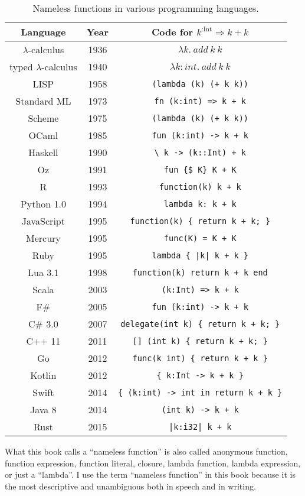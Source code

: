 \begin{table}
\begin{centering}
\begin{tabular}{|c|c|c|}
\hline 
\textbf{Language } & \textbf{Year} & \textbf{Code for }$k^{:\text{Int}}\Rightarrow k+k$\tabularnewline
\hline 
\hline 
$\lambda$-calculus & 1936 & $\lambda k.~add~k~k$\tabularnewline
\hline 
typed $\lambda$-calculus & 1940 & $\lambda k:int.~add~k~k$\tabularnewline
\hline 
LISP & 1958 & \texttt{\footnotesize{}(lambda (k) (+ k k))}\tabularnewline
\hline 
Standard ML & 1973 & \texttt{\footnotesize{}fn (k:int) => k + k}\tabularnewline
\hline 
Scheme & 1975 & \texttt{\footnotesize{}(lambda (k) (+ k k))}\tabularnewline
\hline 
OCaml & 1985 & \texttt{\footnotesize{}fun (k:int) -> k + k}\tabularnewline
\hline 
Haskell  & 1990 & \texttt{\footnotesize{}\textbackslash{} k -> (k::Int) + k}\tabularnewline
\hline 
Oz & 1991 & \texttt{\footnotesize{}fun \{\$ K\} K + K}\tabularnewline
\hline 
R  & 1993 & \texttt{\footnotesize{}function(k) k + k}\tabularnewline
\hline 
Python 1.0 & 1994 & \texttt{\footnotesize{}lambda k: k + k}\tabularnewline
\hline 
JavaScript  & 1995 & \texttt{\footnotesize{}function(k) \{ return k + k; \}}\tabularnewline
\hline 
Mercury  & 1995 & \texttt{\footnotesize{}func(K) = K + K}\tabularnewline
\hline 
Ruby  & 1995 & \texttt{\footnotesize{}lambda \{ |k| k + k \}}\tabularnewline
\hline 
Lua 3.1 & 1998 & \texttt{\footnotesize{}function(k) return k + k end}\tabularnewline
\hline 
Scala  & 2003 & \texttt{\footnotesize{}(k:Int) => k + k}\tabularnewline
\hline 
F\# & 2005 & \texttt{\footnotesize{}fun (k:int) -> k + k}\tabularnewline
\hline 
C\# 3.0 & 2007 & \texttt{\footnotesize{}delegate(int k) \{ return k + k; \}}\tabularnewline
\hline 
C++ 11 & 2011 & \texttt{\footnotesize{}{[}{]} (int k) \{ return k + k; \}}\tabularnewline
\hline 
Go & 2012 & \texttt{\footnotesize{}func(k int) \{ return k + k \}}\tabularnewline
\hline 
Kotlin & 2012 & \texttt{\footnotesize{}\{ k:Int -> k + k \}}\tabularnewline
\hline 
Swift  & 2014 & \texttt{\footnotesize{}\{ (k:int) -> int in return k + k \}}\tabularnewline
\hline 
Java 8 & 2014 & \texttt{\footnotesize{}(int k) -> k + k}\tabularnewline
\hline 
Rust & 2015 & \texttt{\footnotesize{}|k:i32| k + k}\tabularnewline
\hline 
\end{tabular}
\par\end{centering}
\caption{Nameless functions in various programming languages.}
\label{lambda-functions-table}
\end{table}

What this book calls a ``nameless function'' is also called anonymous
function, function expression, function literal, closure, lambda function,
lambda expression, or just a ``lambda''. I use the term ``nameless
function'' in this book because it is the
most descriptive and unambiguous both in speech and in writing.
